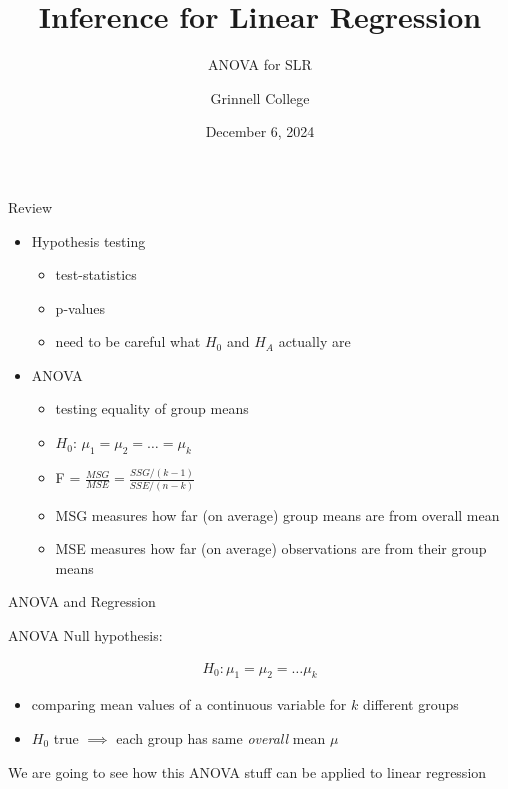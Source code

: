 \documentclass{beamer}
\title[STA-209]{Inference for Linear Regression}
\subtitle{ANOVA for SLR}
\author{Grinnell College}
\date{December 6, 2024}
\begin{document}
\begin{frame}
  \titlepage
\end{frame}

\begin{frame}{Review}

\begin{itemize}
\item Hypothesis testing
\begin{itemize}
    \item test-statistics
    \item p-values
    \item need to be careful what $H_0$ and $H_A$ actually are
\end{itemize} \vspace{4mm}

\item ANOVA
\begin{itemize}
    \item testing equality of group means
    \item $H_0$: $\mu_1 = \mu_2 = \dots = \mu_k$
    \item F = $\frac{MSG}{MSE} = \frac{SSG/(k-1)}{SSE/(n-k)}$
    \item MSG measures how far (on average) group means are from overall mean
    \item MSE measures how far (on average) observations are from their group means
\end{itemize}
\end{itemize}
\end{frame}



\begin{frame}{ANOVA and Regression}

ANOVA Null hypothesis:

\begin{align*}
H_0: \mu_1 = \mu_2 = \dots \mu_k
\end{align*}

\begin{itemize}
    \item comparing mean values of a continuous variable for $k$ different groups
    \item $H_0$ true $\implies$ each group has same \textit{overall} mean $\mu$
\end{itemize} \vspace{8mm}

We are going to see how this ANOVA stuff can be applied to linear regression
\end{frame}
\end{document}

